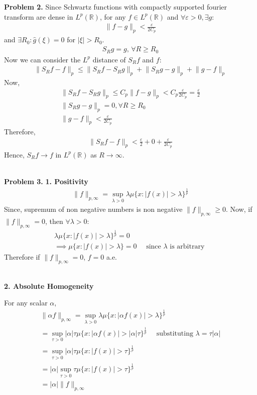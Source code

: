 \documentclass{article}
\newcommand{\R}{\mathbb{R}}
\begin{document}
\textbf{Problem 2. } Since Schwartz functions with compactly supported fourier transform are dense in $L^p(\R)$, for any $f \in L^p(\R)$ and $\forall \varepsilon > 0, \exists g:$
\begin{gather*}
    \lVert f - g\rVert_p < \frac{\varepsilon}{2 C_p}
\end{gather*}
and $\exists R_0: \hat{g}(\xi) = 0$ for $|\xi| > R_0$.
\begin{gather*}
    S_R g = g, \, \forall R \geq R_0
\end{gather*}
Now we can consider the $L^p$ distance of $S_Rf $ and $f$:
\begin{gather*}
    \lVert S_R f - f \rVert_p \leq \lVert S_Rf - S_R g\rVert_p + \lVert S_Rg - g \rVert_p + \lVert g-f \rVert_p
\end{gather*}
Now, 
\begin{gather*}
    \lVert S_Rf - S_R g\rVert_p \leq C_p \lVert f-g \rVert_p < C_p \frac{\varepsilon}{2C_p} = \frac{\varepsilon}{2}\\
    \lVert S_Rg - g \rVert_p = 0, \forall R \geq R_0\\
    \lVert g-f \rVert_p < \frac{\varepsilon}{2C_p}
\end{gather*}
Therefore, 
\begin{gather*}
    \lVert S_R f - f \rVert_p < \frac{\varepsilon}{2} + 0 + \frac{\varepsilon}{2C_p}
\end{gather*}
Hence, $S_R f \to f$ in $L^p(\R)$ as $R\to \infty$.
\\~

\textbf{Problem 3. } \textbf{1. Positivity}
\begin{gather*}
    \lVert f \rVert_{p, \infty} = \sup_{\lambda > 0} \lambda \mu\{x: |f(x)| > \lambda\}^{\frac{1}{p}}
\end{gather*}
Since, supremum of non negative numbers is non negative $\lVert f \rVert_{p, \infty} \geq 0$. Now, if $\lVert f \rVert_{p, \infty} = 0$, then $\forall \lambda > 0$:
\begin{gather*}
    \lambda \mu\{x: |f(x)| > \lambda\}^{\frac{1}{p}} = 0\\
    \implies \mu\{x: |f(x)| > \lambda\} = 0 \quad \text{ since } \lambda \text{ is arbitrary }
\end{gather*}
Therefore if $\lVert f \rVert_{p, \infty} = 0$, $f=0$ a.e.
\\~

\textbf{2. Absolute Homogeneity}

For any scalar $\alpha$,
\begin{gather*}
    \lVert \alpha f \rVert_{p, \infty} = \sup_{\lambda > 0} \lambda \mu\{x: |\alpha f(x)| > \lambda\}^{\frac{1}{p}}\\
    = \sup_{\tau > 0} |\alpha| \tau \mu\{x: |\alpha f(x)| > |\alpha|\tau\}^{\frac{1}{p}} \quad \text{ substituting } \lambda = \tau |\alpha|\\
    = \sup_{\tau > 0} |\alpha| \tau \mu\{x: |f(x)| > \tau\}^{\frac{1}{p}}\\
    = |\alpha| \sup_{\tau > 0} \tau \mu\{x: |f(x)| > \tau\}^{\frac{1}{p}}\\
    = |\alpha| \lVert f \rVert_{p, \infty}
\end{gather*}
\end{document}
